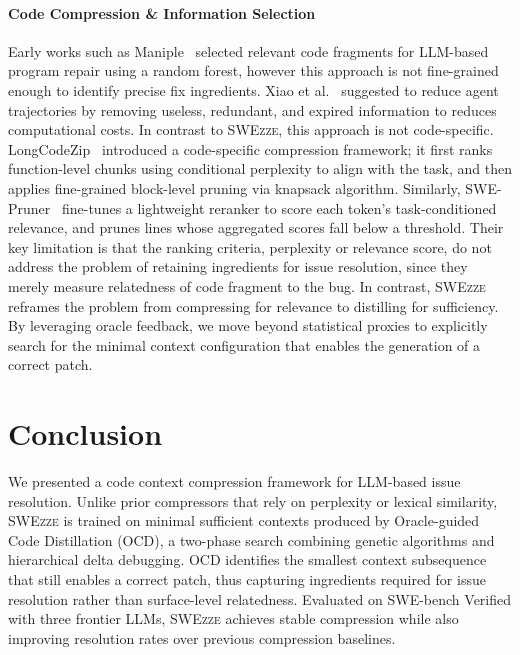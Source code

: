 \documentclass[sigconf,nonacm]{acmart}
\newcommand{\projName}{\textsc{SWEzze}\xspace}
\begin{document}
\paragraph*{Code Compression \& Information Selection} Early works such as Maniple~\cite{parasaram2024fact} selected relevant code fragments for LLM-based program repair using a random forest, however this approach is not fine-grained enough to identify precise fix ingredients. Xiao et al.~\cite{xiao2025improving} suggested to reduce agent trajectories by removing useless, redundant, and expired information to reduces computational costs. In contrast to \projName, this approach is not code-specific. LongCodeZip~\cite{shi2025longcodezip} introduced a code-specific compression framework; it first ranks function-level chunks using conditional perplexity to align with the task, and then applies fine-grained block-level pruning via knapsack algorithm. Similarly, SWE-Pruner~\cite{wang2026swe} fine-tunes a lightweight reranker to score each token's task-conditioned relevance, and prunes lines whose aggregated scores fall below a threshold. Their key limitation is that the ranking criteria, perplexity or relevance score, do not address the problem of retaining ingredients for issue resolution, since they merely measure relatedness of code fragment to the bug. In contrast, \projName reframes the problem from compressing for relevance to distilling for sufficiency. By leveraging oracle feedback, we move beyond statistical proxies to explicitly search for the minimal context configuration that enables the generation of a correct patch.

\section{Conclusion}

We presented a code context compression framework for LLM-based issue resolution. Unlike prior compressors that rely on perplexity or lexical similarity, \projName is trained on minimal sufficient contexts produced by Oracle-guided Code Distillation (OCD), a two-phase search combining genetic algorithms and hierarchical delta debugging. OCD identifies the smallest context subsequence that still enables a correct patch, thus capturing ingredients required for issue resolution rather than surface-level relatedness. Evaluated on SWE-bench Verified with three frontier LLMs, \projName achieves stable compression while also improving resolution rates over previous compression baselines.
\end{document}
